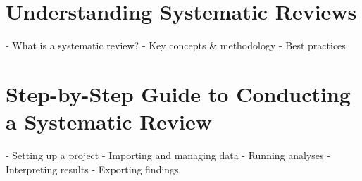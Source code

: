 \chapter{Understanding Systematic Reviews} \label{chap:sysrev}
- What is a systematic review?  
- Key concepts \& methodology  
- Best practices  

\chapter{Step-by-Step Guide to Conducting a Systematic Review} \label{chap:walkthrough}
- Setting up a project  
- Importing and managing data  
- Running analyses  
- Interpreting results  
- Exporting findings  